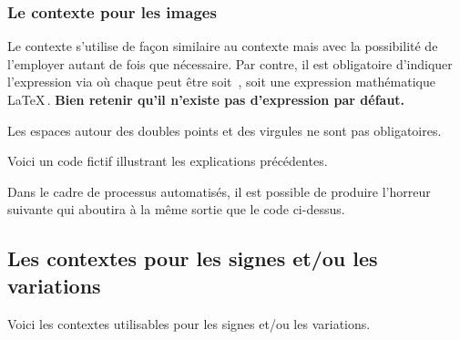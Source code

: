 \documentclass[10pt, a4paper]{article}
\begin{document}
\subsubsection{Le contexte  pour les images}

Le contexte  s'utilise de façon similaire au contexte  mais avec la possibilité de l'employer autant de fois que nécessaire.
Par contre, il est obligatoire d'indiquer l'expression  via
où chaque  peut être soit \,, soit une expression mathématique \LaTeX\,.
\textbf{Bien retenir qu'il n'existe pas d'expression par défaut.}




\begin{tdocnote}
    Les espaces autour des doubles points et des virgules ne sont pas obligatoires.
\end{tdocnote}




Voici un code fictif illustrant les explications précédentes.



Dans le cadre de processus automatisés, il est possible de produire l'horreur suivante qui aboutira à la même sortie que le code ci-dessus.




\subsection{Les contextes pour les signes et/ou les variations}

Voici les contextes utilisables pour les signes et/ou les variations.

\medskip

\begin{itemize*}[before = \leavevmode\kern15pt, itemjoin = \kern15pt]
	\item {}

	\item {}

	\item {}
\end{itemize*}
\end{document}
